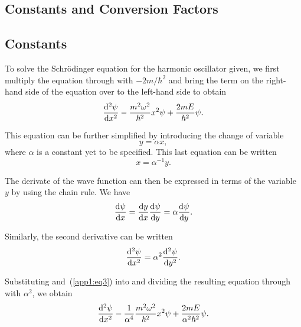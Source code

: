 \begin{backchapter}
\begin{frontmatter}
\chapter{Constants and Conversion Factors}\label{app1}
\makechaptertitle
\end{frontmatter}

\def\thesection{\thechapter.\arabic{section}}


\section{Constants}\label{app1:sec1}

To solve the Schr\"{o}dinger equation for the harmonic oscillator given, we
first multiply the equation through with
$-2m/\hbar^2$ and bring the term on the right-hand side of the equation over to the left-hand side to obtain
\begin{equation}\label{app1:eq1}
\frac{{\rm d}^2\psi}{{\rm d}x^2}-\frac{m^2\omega^2}{\hbar^2}x^2\psi+\frac{2mE}{\hbar^2}\psi.
\end{equation}

This equation can be further simplified by introducing the change of variable
\[
y=\alpha x,
\]
where $\alpha$ is a constant yet to be specified. This last equation can be written
\begin{equation}\label{app1:eq2}
x=\alpha^{-1} y.
\end{equation}

The derivate of the wave function can then be expressed in terms of the variable $y$ by using the chain rule. We have
\[
\frac{{\rm d}\psi}{{\rm d}x}=\frac{{\rm d}y}{{\rm d}x}\frac{{\rm d}\psi}{{\rm d}y}=\alpha\frac{{\rm d}\psi}{{\rm d}y}.
\]

Similarly, the second derivative can be written
\begin{equation}\label{app1:eq3}
\frac{{\rm d}^2\psi}{{\rm d}x^2}=\alpha^2\frac{{\rm d}^2\psi}{{\rm d}y^2}.
\end{equation}

Substituting  and~(\ref{app1:eq3}) into  and dividing the resulting equation
through with $\alpha^2$, we obtain
\begin{equation}\label{app1:eq4}
\frac{{\rm d}^2\psi}{{\rm d}x^2}-\frac{1}{\alpha^4}\frac{m^2\omega^2}{\hbar^2}x^2\psi+\frac{2mE}{\alpha^2\hbar^2}\psi.
\end{equation}


\end{backchapter}

